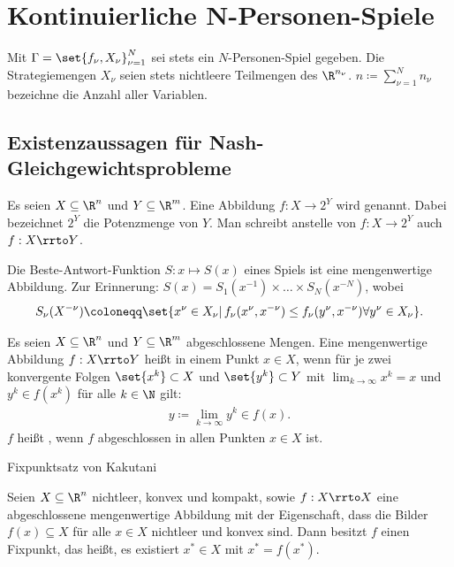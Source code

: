 \section{Kontinuierliche N-Personen-Spiele}

Mit $\Gamma = \set{f_{\nu}, X_{\nu}}_{\nu = 1}^{N}$ sei stets ein $N$-Personen-Spiel gegeben. Die Strategiemengen $X_{\nu}$ seien stets nichtleere Teilmengen des $\R^{n_{\nu}}$. $n \coloneqq \sum_{\nu = 1}^{N} n_{\nu}$ bezeichne die Anzahl aller Variablen.
\subsection{Existenzaussagen für Nash-Gleichgewichtsprobleme}
\label{sec:exist-fur-nash}

\begin{definition*}
  Es seien $X \subseteq \R^{n}$ und $Y\subseteq \R^{m}$. Eine Abbildung $f: X \to 2^{Y}$ wird  genannt. Dabei bezeichnet $2^{Y}$ die Potenzmenge von $Y$. Man schreibt anstelle von $f: X \to 2^{Y}$ auch $f: X \rrto Y$. 
\end{definition*}
\begin{beispiel*}
  Die Beste-Antwort-Funktion
$S: x \mapsto S(x)$ eines Spiels ist eine mengenwertige Abbildung. Zur Erinnerung: $S(x) = S_{1}(x^{-1}) \times \dots \times S_{N}(x^{-N})$, wobei
\begin{align*}
  S_{\nu}(X^{-\nu}) \coloneqq \set{x^{\nu} \in X_{\nu}| \, f_{\nu} (x^{\nu}, x^{-\nu}) \leq f_{\nu}(y^{\nu}, x^{-\nu}) \forall y^{\nu}\in X_{\nu}}. 
\end{align*}
\end{beispiel*}
\begin{definition*}
  Es seien $X\subseteq \R^{n}$ und $Y\subseteq \R^{m}$ abgeschlossene Mengen. Eine mengenwertige Abbildung $f: X \rrto Y$ heißt  in einem Punkt $x \in X$, wenn für je zwei konvergente Folgen $\set{x^{k}} \subset X$ und $\set{y^{k}} \subset Y$ mit $\lim_{k \to \infty} x^{k} = x$ und $y^{k} \in f(x^{k})$ für alle $k \in \N$ gilt:
  \begin{align*}
    y \coloneqq \lim_{k \to \infty} y^{k} \in f(x). 
  \end{align*}
$f$ heißt , wenn $f$ abgeschlossen in allen Punkten $x \in X$ ist. 
\end{definition*}
\begin{satz}Fixpunktsatz von Kakutani
  
Seien $X \subseteq \R^{n}$ nichtleer, konvex und kompakt, sowie $f: X\rrto X$ eine abgeschlossene mengenwertige Abbildung mit der Eigenschaft, dass die Bilder $f(x)\subseteq X$ für alle $x \in X$ nichtleer und konvex sind. Dann besitzt $f$ einen Fixpunkt, das heißt, es existiert $x^{*} \in X$ mit $x^{*} = f(x^{*})$.
\end{satz}
